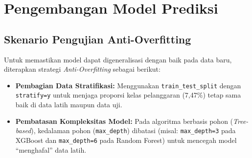 

\section{Pengembangan Model Prediksi}

\subsection{Skenario Pengujian Anti-Overfitting}
Untuk memastikan model dapat digeneralisasi dengan baik pada data baru, diterapkan strategi \textit{Anti-Overfitting} sebagai berikut:
\begin{itemize}
    \item \textbf{Pembagian Data Stratifikasi:} Menggunakan \texttt{train\_test\_split} dengan \texttt{stratify=y} untuk menjaga proporsi kelas pelanggaran (7,47\%) tetap sama baik di data latih maupun data uji.
    \item \textbf{Pembatasan Kompleksitas Model:} Pada algoritma berbasis pohon (\textit{Tree-based}), kedalaman pohon (\texttt{max\_depth}) dibatasi (misal: \texttt{max\_depth=3} pada XGBoost dan \texttt{max\_depth=6} pada Random Forest) untuk mencegah model ``menghafal'' data latih.
\end{itemize}

